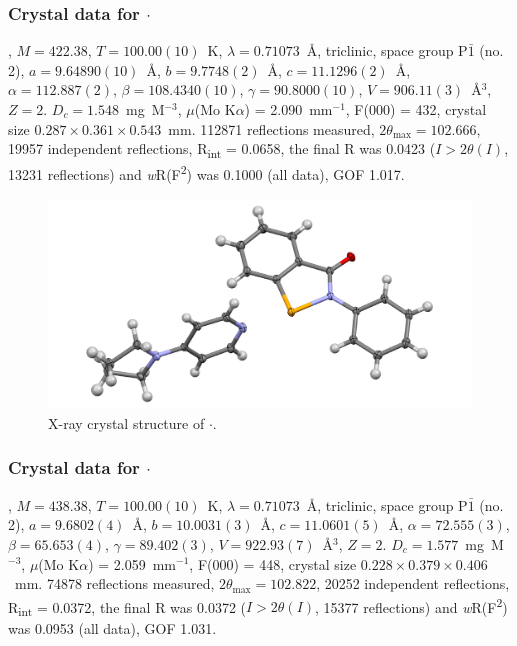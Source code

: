 \begin{refsection}
\subsubsection{Crystal data for \texorpdfstring{$ \cdot $}{C22 H21 N3 O Se}}
, $M=422.38$, $T=100.00(10)$~K, $ \lambda=0.71073 $~\AA, triclinic, space group P$\bar{1}$ (no. 2), $a = 9.64890(10)$~\AA, $b = 9.7748(2)$~\AA, $c = 11.1296(2)$~\AA, $\alpha = 112.887(2)$\degree, $\beta = 108.4340(10)$\degree, $\gamma = 90.8000(10)$\degree, $V = 906.11(3)$~\AA$^{3}$, $Z = 2$. $D_{c}= 1.548$~mg~M$^{-3}$, $\mu$(Mo K$\alpha$) = 2.090~mm$^{-1}$, F(000) = 432, crystal size $0.287 \times 0.361 \times 0.543$~mm. 112871 reflections measured, $2\theta_{\max}=102.666$\degree, 19957 independent reflections, R\textsubscript{int} = 0.0658, the final R was 0.0423 ($I > 2\theta(I)$, 13231 reflections) and \textit{w}R(F\textsuperscript{2}) was 0.1000 (all data), GOF 1.017.

\begin{figure}
  \includegraphics[width=0.6\linewidth]{Figures/ebs-pyrrol-xtal.pdf}
  \caption{X-ray crystal structure of \texorpdfstring{$ \cdot $}{C22 H21 N3 O Se}.}
\end{figure}

\subsubsection{Crystal data for \texorpdfstring{$ \cdot $}{C22 H21 N3 O2 Se}}
, $M=438.38$, $T=100.00(10)$~K, $ \lambda=0.71073 $~\AA, triclinic, space group P$\bar{1}$ (no. 2), $a = 9.6802(4)$~\AA, $b = 10.0031(3)$~\AA, $c = 11.0601(5)$~\AA, $\alpha = 72.555(3)$\degree, $\beta = 65.653(4)$\degree, $\gamma = 89.402(3)$\degree, $V = 922.93(7)$~\AA$^{3}$, $Z = 2$. $D_{c}= 1.577$~mg~M$^{-3}$, $\mu$(Mo K$\alpha$) = 2.059~mm$^{-1}$, F(000) = 448, crystal size $0.228 \times 0.379 \times 0.406$~mm. 74878 reflections measured, $2\theta_{\max}=102.822$\degree, 20252 independent reflections, R\textsubscript{int} = 0.0372, the final R was 0.0372 ($I > 2\theta(I)$, 15377 reflections) and \textit{w}R(F\textsuperscript{2}) was 0.0953 (all data), GOF 1.031.


\end{refsection}
